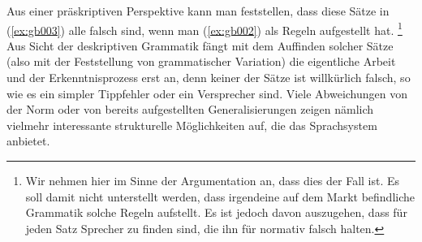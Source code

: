 Aus einer präskriptiven Perspektive kann man feststellen, dass diese Sätze in (\ref{ex:gb003}) alle falsch sind, wenn man (\ref{ex:gb002}) als Regeln aufgestellt hat.%
\footnote{Wir nehmen hier im Sinne der Argumentation an, dass dies der Fall ist.
Es soll damit nicht unterstellt werden, dass irgendeine auf dem Markt befindliche Grammatik solche Regeln aufstellt.
Es ist jedoch davon auszugehen, dass für jeden Satz Sprecher zu finden sind, die ihn für normativ falsch halten.}
Aus Sicht der deskriptiven Grammatik fängt mit dem Auffinden solcher Sätze (also mit der Feststellung von grammatischer Variation) die eigentliche Arbeit und der Erkenntnisprozess erst an, denn keiner der Sätze ist willkürlich falsch, so wie es \zB ein simpler Tippfehler oder ein Versprecher sind.
Viele Abweichungen von der Norm oder von bereits aufgestellten Generalisierungen zeigen nämlich vielmehr interessante strukturelle Möglichkeiten auf, die das Sprachsystem anbietet.

